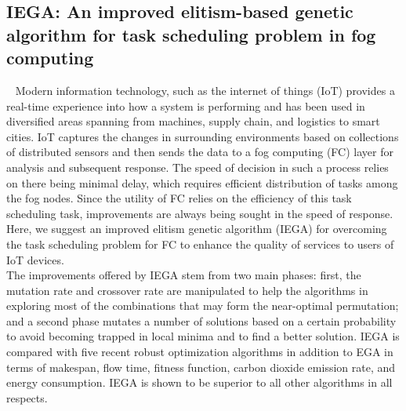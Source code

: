 \subsection{IEGA: An improved elitism-based genetic algorithm for task scheduling problem in fog computing}~\cite{abdel2021iega}
Modern information technology, such as the internet of things (IoT) provides a real-time experience into how a system is performing and has been used in diversified
areas spanning from machines, supply chain, and logistics to smart cities. IoT captures the changes in surrounding environments based on collections of
distributed sensors and then sends the data to a fog computing (FC) layer for analysis and subsequent response. 
The speed of decision in such a process relies on there being minimal delay, which requires efficient distribution of tasks among the fog nodes. 
Since the utility of FC relies on the efficiency of this task scheduling task, improvements are always being sought in the speed of response. 
Here, we suggest an improved elitism genetic algorithm (IEGA) for overcoming the task scheduling problem for FC to enhance the quality of services to users of IoT devices. \\
The improvements offered by IEGA stem from two main phases: first, the mutation rate and crossover rate are manipulated to help the algorithms 
in exploring most of the combinations that may form the near-optimal permutation; and a second phase mutates a number of solutions based on a certain 
probability to avoid becoming trapped in local minima and to find a better solution.
IEGA is compared with five recent robust optimization algorithms in addition to EGA in terms of makespan, flow time, fitness function, carbon dioxide emission
rate, and energy consumption. IEGA is shown to be superior to all other algorithms in all respects.\\

